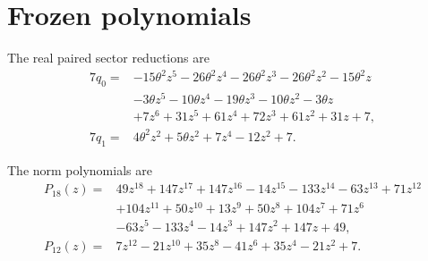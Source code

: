 \appendix
\section{Frozen polynomials}\label{sec:polynomials}

The real paired sector reductions are
\begin{align*}
7q_0={}&-15\theta^2z^5-26\theta^2z^4-26\theta^2z^3-26\theta^2z^2-15\theta^2z\\
&-3\theta z^5-10\theta z^4-19\theta z^3-10\theta z^2-3\theta z\\
&+7z^6+31z^5+61z^4+72z^3+61z^2+31z+7,\\
7q_1={}&4\theta^2z^2+5\theta z^2+7z^4-12z^2+7.
\end{align*}

The norm polynomials are
\begin{align*}
P_{18}(z)={}&49z^{18}+147z^{17}+147z^{16}-14z^{15}-133z^{14}-63z^{13}
+71z^{12}\\
&+104z^{11}+50z^{10}+13z^9+50z^8+104z^7+71z^6\\
&-63z^5-133z^4-14z^3+147z^2+147z+49,\\
P_{12}(z)={}&7z^{12}-21z^{10}+35z^8-41z^6+35z^4-21z^2+7.
\end{align*}

